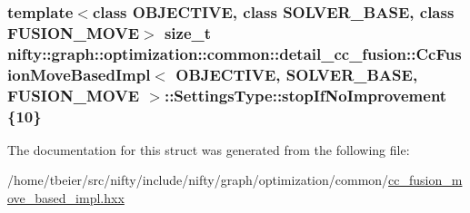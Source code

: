 \subsubsection[{stop\+If\+No\+Improvement}]{\setlength{\rightskip}{0pt plus 5cm}template$<$class O\+B\+J\+E\+C\+T\+I\+V\+E, class S\+O\+L\+V\+E\+R\+\_\+\+B\+A\+S\+E, class F\+U\+S\+I\+O\+N\+\_\+\+M\+O\+V\+E$>$ size\+\_\+t {\bf nifty\+::graph\+::optimization\+::common\+::detail\+\_\+cc\+\_\+fusion\+::\+Cc\+Fusion\+Move\+Based\+Impl}$<$ O\+B\+J\+E\+C\+T\+I\+V\+E, S\+O\+L\+V\+E\+R\+\_\+\+B\+A\+S\+E, F\+U\+S\+I\+O\+N\+\_\+\+M\+O\+V\+E $>$\+::Settings\+Type\+::stop\+If\+No\+Improvement \{10\}}\label{structnifty_1_1graph_1_1optimization_1_1common_1_1detail__cc__fusion_1_1CcFusionMoveBasedImpl_1_1SettingsType_ae4ca7c414154e28735a59e86531f532f}


The documentation for this struct was generated from the following file\+:\begin{DoxyCompactItemize}
\item 
/home/tbeier/src/nifty/include/nifty/graph/optimization/common/\hyperlink{cc__fusion__move__based__impl_8hxx}{cc\+\_\+fusion\+\_\+move\+\_\+based\+\_\+impl.\+hxx}\end{DoxyCompactItemize}
